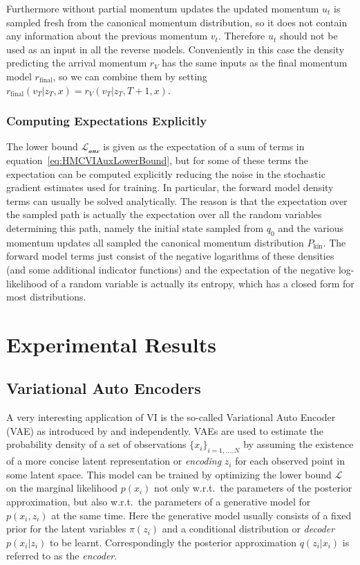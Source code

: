 \documentclass[12pt]{scrartcl}
\begin{document}
Furthermore without partial momentum updates the updated momentum $u_t$ is sampled fresh from the canonical momentum distribution, so it does not contain any information about the previous momentum $v_t$. Therefore $u_t$ should not be used as an input in all the reverse models. Conveniently in this case the density predicting the arrival momentum $r_V$ has the same inputs as the final momentum model $r_\textrm{final}$, so we can combine them by setting $r_\textrm{final}(v_T | z_T, x) = r_V(v_T | z_T, T+1, x)$.

\subsubsection{Computing Expectations Explicitly}

The lower bound $\mathcal{L_\textrm{aux}}$ is given as the expectation of a sum of terms in equation~\eqref{eq:HMCVIAuxLowerBound}, but for some of these terms the expectation can be computed explicitly reducing the noise in the stochastic gradient estimates used for training. In particular, the forward model density terms can usually be solved analytically. The reason is that the expectation over the sampled path is actually the expectation over all the random variables determining this path, namely the initial state sampled from $q_0$ and the various momentum updates all sampled the canonical momentum distribution $P_\textrm{kin}$. The forward model terms just consist of the negative logarithms of these densities (and some additional indicator functions) and the expectation of the negative log-likelihood of a random variable is actually its entropy, which has a closed form for most distributions.

\section{Experimental Results}

\subsection{Variational Auto Encoders}

A very interesting application of VI is the so-called Variational Auto Encoder (VAE) as introduced by \citep{Kingma2014} and \citep{Rezende2014} independently. VAEs are used to estimate the probability density of a set of observations $\{x_i\}_{i=1, \dots, N}$ by assuming the existence of a more concise latent representation or \textit{encoding} $z_i$ for each observed point in some latent space. This model can be trained by optimizing the lower bound $\mathcal{L}$ on the marginal likelihood $p(x_i)$ not only w.r.t.\ the parameters of the posterior approximation, but also w.r.t.\ the parameters of a generative model for $p(x_i, z_i)$ at the same time. Here the generative model usually consists of a fixed prior for the latent variables $\pi(z_i)$ and a conditional distribution or \textit{decoder} $p(x_i|z_i)$ to be learnt. Correspondingly the posterior approximation $q(z_i|x_i)$ is referred to as the \textit{encoder}.
\end{document}
